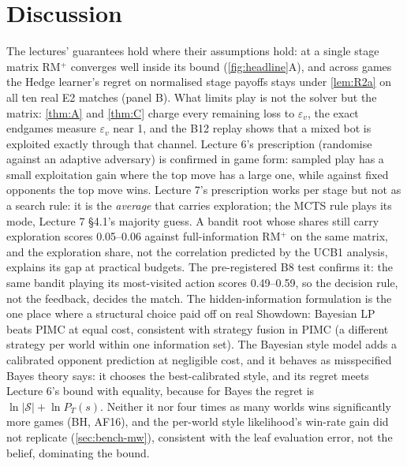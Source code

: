 \documentclass[10pt]{article}
\theoremstyle{plain}
\theoremstyle{definition}
\theoremstyle{remark}
\newcommand{\epsv}{\varepsilon_v}
\begin{document}
\section{Discussion}\label{sec:disc}

The lectures' guarantees hold where their assumptions hold: at a single stage matrix RM$^+$ converges well inside its
bound (\cref{fig:headline}A), and across games the Hedge learner's regret on normalised stage payoffs stays under \cref{lem:R2a} on all
ten real E2 matches (panel B). What
limits play is not the solver but the matrix: \cref{thm:A} and \cref{thm:C} charge every remaining loss to $\epsv$, the
exact endgames measure $\epsv$ near 1, and the B12 replay shows that a mixed bot is exploited exactly through that
channel. Lecture 6's prescription (randomise against an adaptive adversary) is confirmed in game form: sampled play has
a small exploitation gain where the top move has a large one, while against fixed opponents the top move wins.
Lecture 7's prescription works per stage but not as a search rule: it is the
\emph{average} that carries exploration; the MCTS rule plays its mode, Lecture 7 \S4.1's majority guess. A bandit root whose shares still carry exploration
scores 0.05--0.06 against full-information RM$^+$ on the same matrix, and the exploration share, not the correlation
predicted by the UCB1 analysis, explains its gap at practical budgets. The pre-registered B8 test confirms it: the same
bandit playing its most-visited action scores 0.49--0.59, so the decision rule, not the feedback, decides the match. The hidden-information formulation is the one
place where a structural choice paid off on real Showdown: Bayesian LP beats PIMC at equal cost, consistent with
strategy fusion in PIMC (a different strategy per world within one information set). The Bayesian style model adds a calibrated opponent
prediction at negligible cost, and it behaves as misspecified Bayes theory says: it chooses the best-calibrated style, and its regret meets Lecture 6's bound with
equality, because for Bayes the regret is $\ln|\mathcal S|+\ln P_T(s)$.
Neither it nor four times as many worlds wins significantly more games (BH, AF16), and the per-world style likelihood's
win-rate gain did not replicate (\cref{sec:bench-mw}), consistent with the leaf evaluation error, not the belief, dominating the bound.

\end{document}

